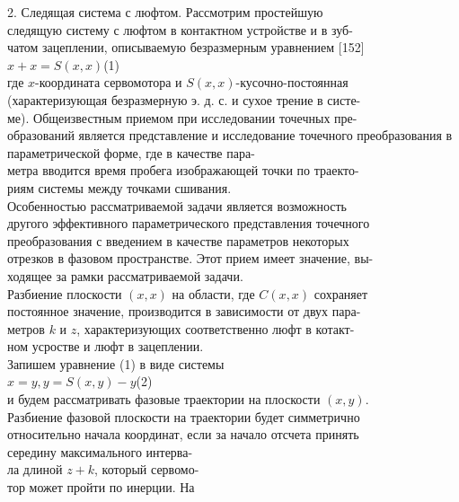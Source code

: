 \documentclass{article}
\begin{document}
2. Следящая система с люфтом. Рассмотрим простейшую\\
следящую систему с люфтом в контактном устройстве и в зуб-\\
чатом зацеплении, описываемую безразмерным уравнением [152]\\
{\centering$x+x=S(x, x)$(1)}\\
где $x$-координата сервомотора и $S(x, x)$-кусочно-постоянная\\
(характеризующая безразмерную э. д. с. и сухое трение в систе-\\ме).
Общеизвестным приемом при исследовании точечных пре-\\
образований является представление и исследование точечного преобразования в параметрической форме, где в качестве пара-\\
метра вводится время пробега изображающей точки по траекто-\\
риям системы между точками сшивания.\\%
Особенностью рассматриваемой задачи является возможность\\
другого эффективного параметрического представления точечного\\
преобразования с введением в качестве параметров некоторых\\
отрезков в фазовом пространстве. Этот прием имеет значение, вы-\\
ходящее за рамки рассматриваемой задачи.\\%
Разбиение плоскости $(x, x)$ на области, где $C(x, x)$ сохраняет\\
постоянное значение, производится в зависимости от двух пара-\\
метров $k$ и $z$, характеризующих соответственно люфт в котакт-\\
ном усростве и люфт в зацеплении.\\%
Запишем уравнение (1) в виде системы\\
$x=y, y=S(x,y)-y$(2)\\
и будем рассматривать фазовые траектории на плоскости $(x, y)$.\\
Разбиение фазовой плоскости на траектории будет симметрично\\
относительно начала координат, если за начало отсчета принять\\
середину максимального интерва-\\
ла длиной $z+k$, который сервомо-\\
тор может пройти по инерции. На\\
\end{document}
